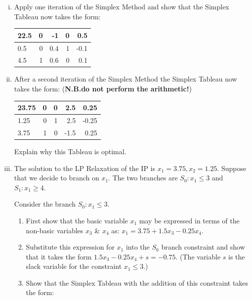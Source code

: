 \documentclass[12pt]{article}
\begin{document}
\begin{itemize}
			\begin{enumerate}[(i)]
				\item Apply one iteration of the Simplex Method and show that the  Simplex Tableau now takes the form:
				\begin{center}
				\begin{tabular}[h]{|l|rrrr|}\hline
					22.5&0&-1&0&0.5\\\hline
					0.5&0&0.4&1&-0.1\\
					4.5&1&0.6&0&0.1\\\hline
				\end{tabular}
				\end{center}
				\item After a second iteration of  the Simplex Method the  Simplex Tableau now takes the form: ({\bf N.B.do not perform the arithmetic!})
				\begin{center}
				\begin{tabular}[h]{|l|rrrr|}\hline
					23.75     &        0            & 0&          2.5&          0.25\\\hline
					1.25&             0&          1&          2.5&         -0.25\\
					3.75&          1&             0&         -1.5&          0.25\\\hline
				\end{tabular}
				\end{center}
				Explain why this Tableau is optimal.
				\item The solution to the LP Relaxation of the IP is $x_1=3.75, x_2=1.25$. 		
				Suppose that we decide to branch on $x_1$. The two branches are $S_0: x_1 \le 3$ and $S_1: x_1 \ge 4$. 

			\medskip Consider the branch  $S_0: x_1 \le 3$.
				\begin{enumerate}
					\item First show that the basic variable $x_1$ may be expressed in terms of the non-basic variables $x_3$ \& $x_4$ as: $x_1 =3.75+1.5 x_3 -0.25 x_4$.
					\item Substitute this expression for $x_1$ into the $S_0$ branch constraint and show that it takes the form $1.5 x_3-0.25 x_4 +s=-0.75$. (The variable $s$ is the slack variable for the constraint $x_1 \le 3$.)
					\item Show that the  Simplex Tableau with the addition of this constraint takes the form:
					\vspace{10pt}
					

\end{enumerate}
\end{enumerate}
\end{itemize}
\end{document}
